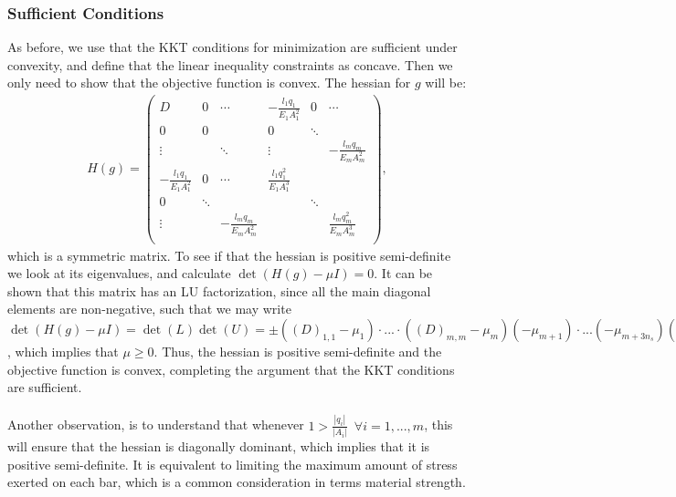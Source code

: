\documentclass[10pt,a4paper]{article}
\begin{document}
\subsubsection{Sufficient Conditions}
As before, we use that the KKT conditions for minimization are sufficient under convexity, and define that the linear inequality constraints as concave. Then we only need to show that the objective function is convex. 
\newpage
\noindent
The hessian for $g$ will be:
\begin{align}
H(g) = 
\begin{pmatrix}
D & 0 & \cdots & -\frac{l_1 q_1}{E_1 A_1^2} &0 &\cdots \\
0 & 0 &  & 0& \ddots & \\
\vdots &  & \ddots &\vdots  &  & -\frac{l_m q_m}{E_m A_m^2} \\
-\frac{l_1 q_1}{E_1 A_1^2} & 0 & \cdots & \frac{l_1 q_1^2}{E_1 A_1^3} \\
0 & \ddots& & & \ddots\\
\vdots & & -\frac{l_m q_m}{E_m A_m^2}&& & \frac{l_m q_m^2}{E_m A_m^3} \\
\end{pmatrix},
\end{align}
which is a symmetric matrix. To see if that the hessian is positive semi-definite we look at its eigenvalues, and calculate $\det(H(g)-\mu I)=0$. It can be shown that this matrix has an LU factorization, since all the main diagonal elements are non-negative, such that we may write $\det(H(g)-\mu I) = \det(L)\det(U) = \pm ((D)_{1,1}-\mu_1)\cdot ...\cdot((D)_{m,m}-\mu_m)(-\mu_{m+1})\cdot ...(-\mu_{m+3n_s})( \frac{l_1 q_1^2}{E_1 A_1^3}-\mu_{m+3n_s+1})\cdot ...\cdot( \frac{l_m q_m^2}{E_m A_m^3}-\mu_{2m+3n_s}) = 0$, which implies that $\mu \geq 0$. Thus, the hessian is positive semi-definite and the objective function is convex, completing the argument that the KKT conditions are sufficient.
\\\\
Another observation, is to understand that whenever $1 >\frac{|q_i|}{|A_i|} \enspace \forall i=1,...,m$, this will ensure that the hessian is diagonally dominant, which implies that it is positive semi-definite. It is equivalent to limiting the maximum amount of stress exerted on each bar, which is a common consideration in terms material strength.
\end{document}
